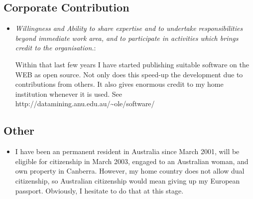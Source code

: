 \documentclass[12pt,a4paper]{article}
\begin{document}
\subsection*{Corporate Contribution}
\begin{itemize} 
  \item \textit{Willingness and Ability to share expertise and to undertake responsibilities beyond immediate work area, and to participate in activities which brings credit to the organisation.}: 

  Within that last few years I have started publishing suitable 
  software on the WEB as open source. Not only does this speed-up the 
  development due to contributions from others. It also gives enormous 
  credit to my home institution whenever it is used.
  See http://datamining.anu.edu.au/\~{}ole/software/
    
\end{itemize}

\subsection*{Other}
\begin{itemize} 
  \item I have been an permanent resident in Australia since March 2001,
  will be eligible for citizenship in March 2003, 
  engaged to an Australian woman,
  and own property in Canberra. 
  However, my home country does not allow dual citizenship, 
  so Australian citizenship would mean giving up my European passport.
  Obviously, I hesitate to do that at this stage.
\end{itemize} 
\end{document}
